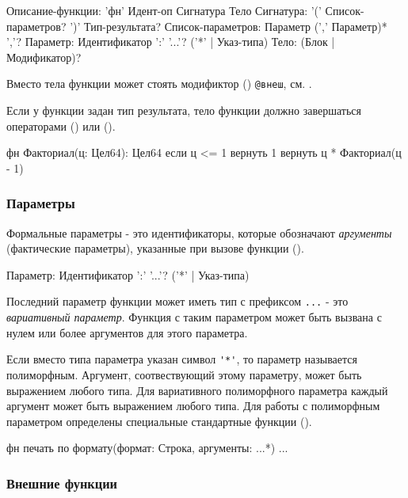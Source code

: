 \begin{Grammar}
Описание-функции: 'фн' Идент-оп Сигнатура Тело
Сигнатура: '(' Список-параметров? ')' Тип-результата?
Список-параметров: Параметр (',' Параметр)* ','?
Параметр: Идентификатор ':' '...'? ('*' | Указ-типа)  
Тело: (Блок | Модификатор)?
\end{Grammar} 

Вместо тела функции может стоять модификтор () \verb|@внеш|, см. .

Если у функции задан тип результата, тело функции должно завершаться операторами  () или  ().

\begin{Trivil}
фн Факториал(ц: Цел64): Цел64 {
    если ц <= 1 { вернуть 1 }
    вернуть ц * Факториал(ц - 1)
}
\end{Trivil}

\hypertarget{params}{%
\subsubsection{Параметры}\label{decls:params}}

Формальные параметры - это идентификаторы, которые обозначают \emph{аргументы} (фактические параметры), указанные при вызове функции ().

\begin{Grammar}
Параметр: Идентификатор ':' '...'? ('*' | Указ-типа)  
\end{Grammar} 

Последний параметр функции может иметь тип с префиксом \verb|...| - это \emph{вариативный параметр}. Функция с таким параметром может быть вызвана с нулем или более аргументов для этого параметра.

Если вместо типа параметра указан символ \verb|'*'|, то параметр называется полиморфным.
Аргумент, соотвествующий этому параметру, может быть выражением любого типа. 
Для вариативного полиморфного параметра каждый аргумент может быть выражением любого типа. 
Для работы с полиморфным параметром определены специальные стандартные функции ().

\begin{Trivil}
фн печать по формату(формат: Строка, аргументы: ...*) {
...
}
\end{Trivil}

\hypertarget{extern-fn}{%
\subsubsection{Внешние функции}\label{decls:extern-fn}}


